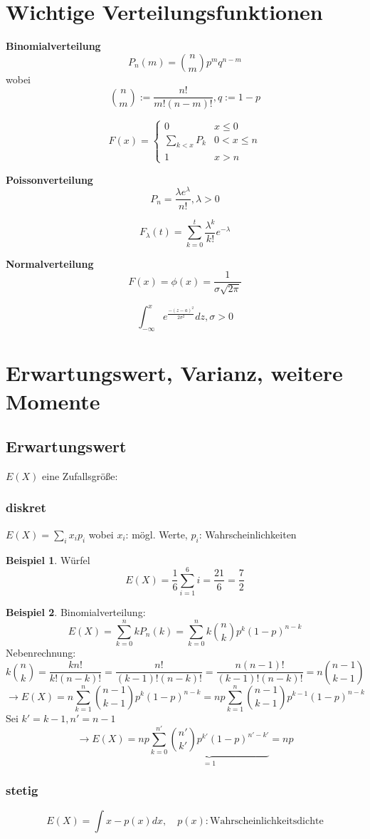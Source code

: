 \documentclass[10pt]{report}
\theoremstyle{definition}
\newtheorem{exmp}{Beispiel}
\begin{document}
\section{Wichtige Verteilungsfunktionen}
\textbf{Binomialverteilung}
\[ P_n(m)=\binom{n}{m}p^m q^{n-m} \] 
wobei \[ \binom{n}{m}:=\frac{n!}{m!(n-m)!}, q:= 1-p \] 

\[ F(x)=
  \begin{cases}
    0 & x \leq 0 \\
    \sum\limits_{k<x}P_k & 0 < x \leq n \\
    1 & x > n
  \end{cases}
\] 

\textbf{Poissonverteilung}
\[ P_n=\frac{\lambda e^{\lambda}}{n!}, \lambda > 0 \]

\[ F_{\lambda}(t)=\sum_{k=0}^t \frac{\lambda^k}{k!}e^{-\lambda} \]

\textbf{Normalverteilung}
\[ F(x)=\phi(x)=\frac{1}{\sigma\sqrt{2\pi}} \]

\[ \int_{-\infty}^x e^{\frac{-(z-a)^2}{2\sigma^2}} dz , \sigma > 0 \]

\section{Erwartungswert, Varianz, weitere Momente}
\subsection{Erwartungswert} $E(X)$ eine Zufallsgröße:\\
\subsubsection{diskret}
$E(X)=\sum_i x_i p_i$ wobei $x_i$: mögl. Werte, $p_i$: Wahrscheinlichkeiten \\

\begin{exmp}
	Würfel 
	\[ E(X)=\frac{1}{6} \sum_{i=1}^6 i = \frac{21}{6} = \frac{7}{2} \]
\end{exmp}
\begin{exmp}
	Binomialverteilung: 
	\[ E(X)= \sum_{k=0}^n k P_n(k) = \sum_{k=0}^n k \binom{n}{k} p^k(1-p)^{n-k} \] 
	Nebenrechnung:
	\[ k \binom{n}{k} = \frac{k n!}{k! (n-k)!} = \frac{n!}{(k-1)!(n-k)!} = \frac{n(n-1)!}{(k-1)!(n-k)!} = n \binom{n-1}{k-1} \] 
	\[\rightarrow E(X)= n \sum_{k=1}^{n} \binom{n-1}{k-1} p^k (1-p)^{n-k} = np \sum_{k=1}^n \binom{n-1}{k-1} p^{k-1} (1-p)^{n-k} \] 
	Sei $k'=k-1, n'=n-1$ \\
	\[ \rightarrow E(X)=np \underbrace{\sum_{k=0}^{n'} \binom{n'}{k'} p^{k'}(1-p)^{n'-k'}}_{=1} = np \]
	
\subsubsection{stetig} 
	\[ E(X)=\int x - p(x) dx , \quad p(x): \text{Wahrscheinlichkeitsdichte} \]
\end{exmp} 
\end{document}
